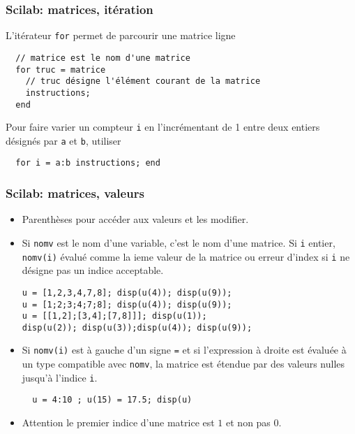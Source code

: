 \begin{frame}[fragile]
  \frametitle{Scilab: matrices, itération}
L'itérateur \texttt{for} permet de parcourir une matrice ligne 
\begin{verbatim}
  // matrice est le nom d'une matrice
  for truc = matrice
    // truc désigne l'élément courant de la matrice 
    instructions;
  end
\end{verbatim}
Pour faire varier un compteur \texttt{i} en l'incrémentant de 1 entre deux entiers désignés par \texttt{a} et \texttt{b}, utiliser 
\begin{verbatim}
  for i = a:b instructions; end
\end{verbatim}
\end{frame}

\begin{frame}[fragile]
  \frametitle{Scilab: matrices, valeurs}
\begin{itemize}
  \item Parenthèses pour accéder aux valeurs et les modifier.
  \item Si \texttt{nomv} est le nom d'une variable, c'est le nom d'une matrice. Si \texttt{i} entier, \texttt{nomv(i)} évalué comme la ieme valeur de la matrice ou erreur d'index si \texttt{i} ne désigne pas un indice acceptable.
\begin{verbatim}
u = [1,2,3,4,7,8]; disp(u(4)); disp(u(9));  
u = [1;2;3;4;7;8]; disp(u(4)); disp(u(9)); 
u = [[1,2];[3,4];[7,8]]]; disp(u(1)); 
disp(u(2)); disp(u(3));disp(u(4)); disp(u(9));  
\end{verbatim}
  \item Si \texttt{nomv(i)} est à gauche d'un signe \texttt{=} et si l'expression à droite est évaluée à un type compatible avec \texttt{nomv}, la matrice est étendue par des valeurs nulles jusqu'à l'indice \texttt{i}.
\begin{verbatim}
  u = 4:10 ; u(15) = 17.5; disp(u)
\end{verbatim}
  \item Attention le premier indice d'une matrice est $1$ et non pas $0$.
\end{itemize}
\end{frame}

